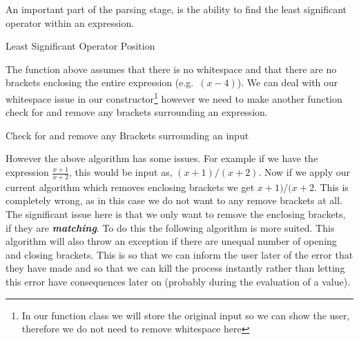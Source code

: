 \documentclass{article}
\newcounter{subsubsubsection}[subsubsection]
\begin{document}
\newpage
{}
An important part of the parsing stage, is the ability to find the least significant operator within an expression.
\begin{algorithm}[H]
\caption{Least Significant Operator Position}
\DontPrintSemicolon
{}
\end{algorithm}
The function above assumes that there is no whitespace and that there are no brackets enclosing the entire expression (e.g.\ $(x-4)$). We can deal with our whitespace issue in our constructor\footnote{In our function class we will store the original input so we can show the user, therefore we do not need to remove whitespace here} however we need to make another function check for and remove any brackets surrounding an expression. 
\begin{algorithm}[H]
\DontPrintSemicolon
\caption{Check for and remove any Brackets surrounding an input}
\end{algorithm}
\newpage
However the above algorithm has some issues. For example if we have the expression $\frac{x+1}{x+2}$, this would be input as, $(x+1)/(x+2)$. Now if we apply our current algorithm which removes enclosing brackets we get $x+1)/(x+2$. This is completely wrong, as in this case we do not want to any remove brackets at all. The significant issue here is that we only want to remove the enclosing brackets, if they are \textit{\textbf{matching}}. To do this the following algorithm is more suited. This algorithm will also throw an exception if there are unequal number of opening and closing brackets. This is so that we can inform the user later of the error that they have made and so that we can kill the process instantly rather than letting this error have consequences later on (probably during the evaluation of a value).\\
\end{document}

